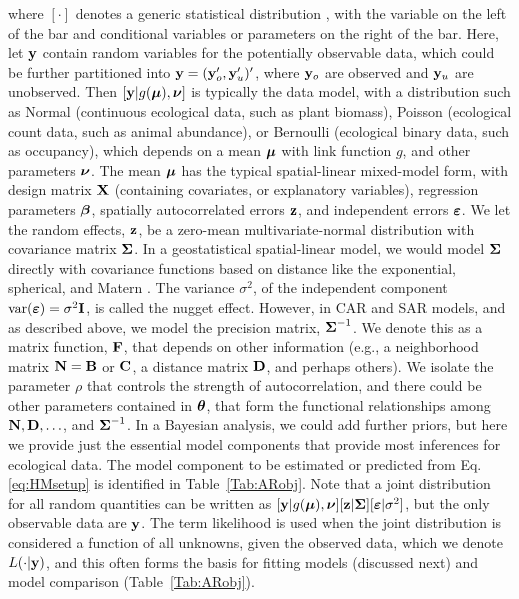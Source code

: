 \documentclass[11pt, titlepage]{article}\usepackage[]{graphicx}\usepackage[]{color}
\begin{document}
\begin{spacing}{1.9}
\begin{flushleft}
where $[\cdot]$ denotes a generic statistical distribution \citep{Gelf:Smit:samp:1990}, with the variable on the left of the bar and conditional variables or parameters on the right of the bar.  Here, let $\mathbf{y}$ contain random variables for the potentially observable data, which could be further partitioned into $\mathbf{y} = (\mathbf{y}_o^{\prime}, \mathbf{y}_u^{\prime})^{\prime}$, where $\mathbf{y}_o$ are observed and $\mathbf{y}_u$ are unobserved.  Then $[\mathbf{y}|g(\mbox{\boldmath $\mu$}), \mbox{\boldmath $\nu$}]$ is typically the data model, with a distribution such as Normal (continuous ecological data, such as plant biomass), Poisson (ecological count data, such as animal abundance), or Bernoulli (ecological binary data, such as occupancy), which depends on a mean $\mbox{\boldmath $\mu$}$ with link function $g$, and other parameters $\mbox{\boldmath $\nu$}$.  The mean $\mbox{\boldmath $\mu$}$ has the typical spatial-linear mixed-model form, with design matrix $\mathbf{X}$ (containing covariates, or explanatory variables), regression parameters $\mbox{\boldmath $\beta$}$, spatially autocorrelated errors $\mathbf{z}$, and independent errors $\mbox{\boldmath $\varepsilon$}$.  We let the random effects, $\mathbf{z}$, be a zero-mean multivariate-normal distribution with covariance matrix $\mbox{\boldmath $\Sigma$}$.  In a geostatistical spatial-linear model, we would model $\mbox{\boldmath $\Sigma$}$ directly with covariance functions based on distance like the exponential, spherical, and Matern \citep{Chil:Delf:geos:1999}. The variance $\sigma^2$, of the independent component $\textrm{var}(\mbox{\boldmath $\varepsilon$}) = \sigma^2\mathbf{I}$, is called the nugget effect.  However, in CAR and SAR models, and as described above, we model the precision matrix, $\mbox{\boldmath $\Sigma$}^{-1}$.  We denote this as a matrix function, $\mathbf{F}$, that depends on other information (e.g., a neighborhood matrix $\mathbf{N} = \mathbf{B}$ or $\mathbf{C}$, a distance matrix $\mathbf{D}$, and perhaps others). We isolate the parameter $\rho$ that controls the strength of autocorrelation, and there could be other parameters contained in $\mbox{\boldmath $\theta$}$, that form the functional relationships among $\mathbf{N}, \mathbf{D}, \ldots$, and $\mbox{\boldmath $\Sigma$}^{-1}$. In a Bayesian analysis, we could add further priors, but here we provide just the essential model components that provide most inferences for ecological data.  The model component to be estimated or predicted from Eq. \ref{eq:HMsetup} is identified in Table~\ref{Tab:ARobj}.  Note that a joint distribution for all random quantities can be written as $[\mathbf{y}|g(\mbox{\boldmath $\mu$}),\mbox{\boldmath $\nu$}][\mathbf{z}|\mbox{\boldmath $\Sigma$}][\mbox{\boldmath $\varepsilon$}|\sigma^2]$, but the only observable data are $\mathbf{y}$. The term likelihood is used when the joint distribution is considered a function of all unknowns, given the observed data, which we denote $L(\cdot|\mathbf{y})$, and this often forms the basis for fitting models (discussed next) and model comparison (Table~\ref{Tab:ARobj}).


\end{flushleft}
\end{spacing}
\end{document}
